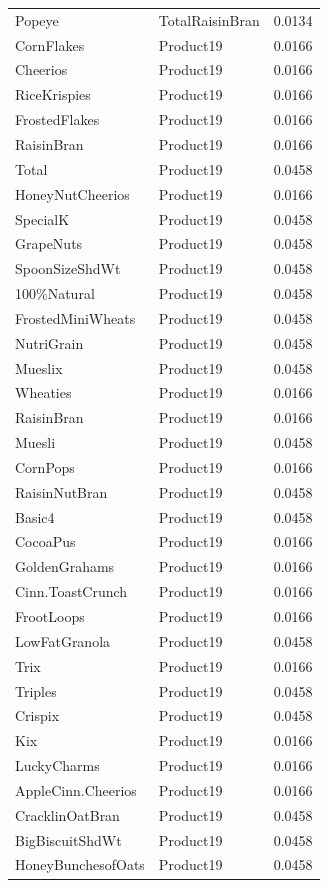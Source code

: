 \begin{table}[!htbp]
\begin{tabular}{lll}
Popeye & TotalRaisinBran & 0.0134
\\
CornFlakes & Product19 & 0.0166
\\
Cheerios & Product19 & 0.0166
\\
RiceKrispies & Product19 & 0.0166
\\
FrostedFlakes & Product19 & 0.0166
\\
RaisinBran & Product19 & 0.0166
\\
Total & Product19 & 0.0458
\\
HoneyNutCheerios & Product19 & 0.0166
\\
SpecialK & Product19 & 0.0458
\\
GrapeNuts & Product19 & 0.0458
\\
SpoonSizeShdWt & Product19 & 0.0458
\\
100\%Natural & Product19 & 0.0458
\\
FrostedMiniWheats & Product19 & 0.0458
\\
NutriGrain & Product19 & 0.0458
\\
Mueslix & Product19 & 0.0458
\\
Wheaties & Product19 & 0.0166
\\
RaisinBran & Product19 & 0.0166
\\
Muesli & Product19 & 0.0458
\\
CornPops & Product19 & 0.0166
\\
RaisinNutBran & Product19 & 0.0458
\\
Basic4 & Product19 & 0.0458
\\
CocoaPus & Product19 & 0.0166
\\
GoldenGrahams & Product19 & 0.0166
\\
Cinn.ToastCrunch & Product19 & 0.0166
\\
FrootLoops & Product19 & 0.0166
\\
LowFatGranola & Product19 & 0.0458
\\
Trix & Product19 & 0.0166
\\
Triples & Product19 & 0.0458
\\
Crispix & Product19 & 0.0458
\\
Kix & Product19 & 0.0166
\\
LuckyCharms & Product19 & 0.0166
\\
AppleCinn.Cheerios & Product19 & 0.0166
\\
CracklinOatBran & Product19 & 0.0458
\\
BigBiscuitShdWt & Product19 & 0.0458
\\
HoneyBunchesofOats & Product19 & 0.0458

\end{tabular}
\end{table}
